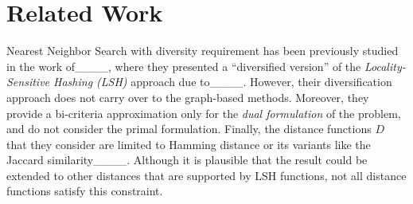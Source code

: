 \section{Related Work}
Nearest Neighbor Search with diversity requirement has been previously studied in the work of____, where they presented a ``diversified version'' of the {\em Locality-Sensitive Hashing (LSH)} approach due to____. However, their diversification approach does not carry over to the graph-based methods.
Moreover, they provide a bi-criteria approximation only for the {\em dual formulation} of the problem, and do not consider the primal formulation.
Finally, the distance functions $D$ that they consider are limited to Hamming distance or its variants like the Jaccard similarity____. Although it is plausible that the result could be extended to other distances that are supported by LSH functions, not all distance functions satisfy this constraint.
